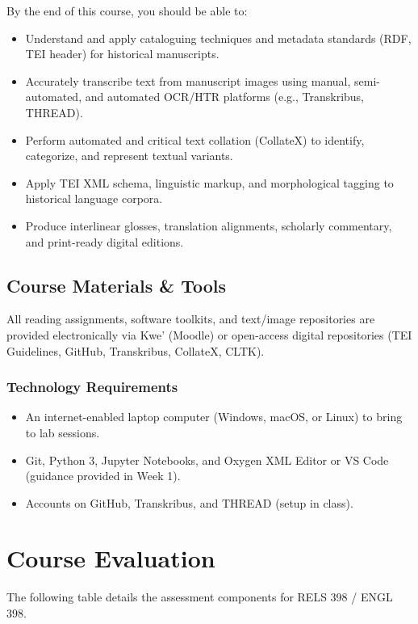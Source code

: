 \documentclass[12pt,oncampus]{article}
\begin{document}
By the end of this course, you should be able to:
\begin{itemize}
  \item Understand and apply cataloguing techniques and metadata standards (RDF, TEI header) for historical manuscripts.
  \item Accurately transcribe text from manuscript images using manual, semi-automated, and automated OCR/HTR platforms (e.g., Transkribus, THREAD).
  \item Perform automated and critical text collation (CollateX) to identify, categorize, and represent textual variants.
  \item Apply TEI XML schema, linguistic markup, and morphological tagging to historical language corpora.
  \item Produce interlinear glosses, translation alignments, scholarly commentary, and print-ready digital editions.
\end{itemize}

\subsection*{Course Materials \& Tools}

All reading assignments, software toolkits, and text/image repositories are provided electronically via Kwe' (Moodle) or open-access digital repositories (TEI Guidelines, GitHub, Transkribus, CollateX, CLTK).

\subsubsection*{Technology Requirements}
\begin{itemize}
  \item An internet-enabled laptop computer (Windows, macOS, or Linux) to bring to lab sessions.
  \item Git, Python 3, Jupyter Notebooks, and Oxygen XML Editor or VS Code (guidance provided in Week 1).
  \item Accounts on GitHub, Transkribus, and THREAD (setup in class).
\end{itemize}

\section*{Course Evaluation}

The following table details the assessment components for RELS 398 / ENGL 398.
\end{document}
